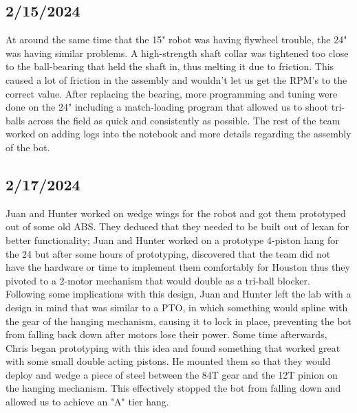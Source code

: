 \subsection{2/15/2024}
At around the same time that the 15" robot was having flywheel trouble, the 24" was having similar problems. A high-strength shaft collar was tightened too close to the ball-bearing that held the shaft in, thus melting it due to friction. This caused a lot of 
friction in the assembly and wouldn't let us get the RPM's to the correct value. After replacing the bearing, more programming and tuning were done on the 24" including a match-loading program that allowed us to shoot tri-balls across the field as quick and consistently as possible.
The rest of the team worked on adding logs into the notebook and more details regarding the assembly of the bot. 
\subsection{2/17/2024}
Juan and Hunter worked on wedge wings for the robot and got them prototyped out of some old ABS. They deduced that they needed to be built out of lexan for better functionality; Juan and Hunter worked on a prototype 4-piston hang for the 24 but after some hours of prototyping, discovered that the team did not have the hardware or time to implement them comfortably for Houston thus they pivoted to a 2-motor mechanism that would double as a tri-ball blocker.
Following some implications with this design, Juan and Hunter left the lab with a design in mind that was similar to a PTO, in which something would spline with the gear of the hanging mechanism, causing it to lock in place, preventing the bot from falling back down after motors lose their power.
Some time afterwards, Chris began prototyping with this idea and found something that worked great with some small double acting pistons. He mounted them so that they would deploy and wedge a piece of steel between the 84T gear and the 12T pinion on the hanging mechanism. This effectively stopped the bot from falling down and allowed us to achieve an "A" tier hang. 
